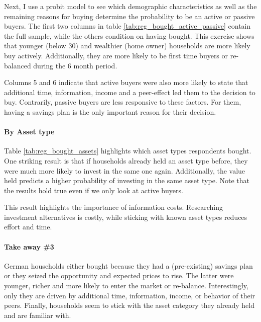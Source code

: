 \documentclass[ProjectABM]{subfiles}
\begin{document}

Next, I use a probit model to see which demographic characteristics as well as the remaining reasons for buying determine the probability to be an active or passive buyers. The first two columns in table \ref{tab:reg_bought_active_passive} contain the full sample, while the others condition on having bought. This exercise shows that younger (below 30) and wealthier (home owner) households are more likely buy actively. Additionally, they are more likely to be first time buyers or re-balanced during the 6 month period.

Columns 5 and 6 indicate that active buyers were also more likely to state that additional time, information, income and a peer-effect led them to the decision to buy. Contrarily, passive buyers are less responsive to these factors. For them, having a savings plan is the only important reason for their decision.





\paragraph{By Asset type}
Table \ref{tab:reg_bought_assets} highlights which asset types respondents bought. One striking result is that if households already held an asset type before, they were much more likely to invest in the same one again. Additionally, the value held predicts a higher probability of investing in the same asset type. Note that the results hold true even if we only look at active buyers.

This result highlights the importance of information costs. Researching investment alternatives is costly, while sticking with known asset types reduces effort and time.%



\paragraph{Take away \#3}
German households either bought because they had a (pre-existing) savings plan or they seized the opportunity and expected prices to rise. The latter were younger, richer and more likely to enter the market or re-balance. Interestingly, only they are driven by additional time, information, income, or behavior of their peers. Finally, households seem to stick with the asset category they already held and are familiar with.
\end{document}
